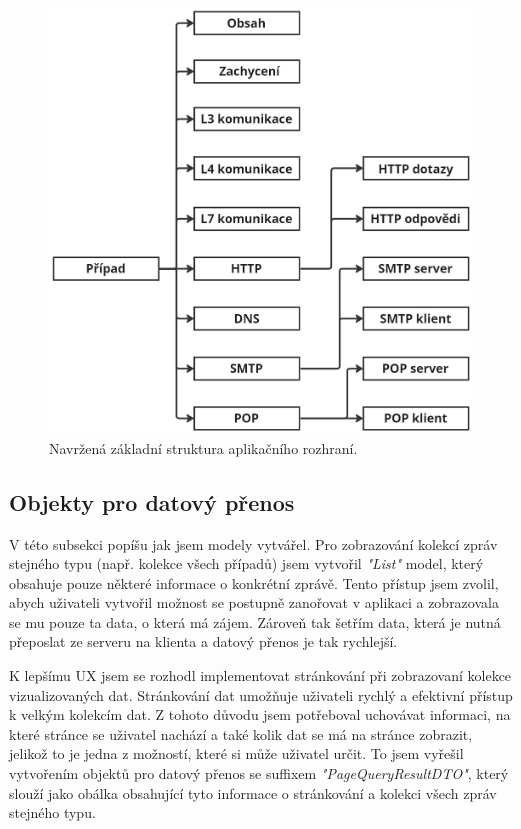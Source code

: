         \begin{figure}[H]
            \centering
            \includegraphics[scale=0.3]{obrazky-figures/Implementace/NavrhAPI/APIStructure.jpg}
            \caption{Navržená základní struktura aplikačního rozhraní.}
            \label{fig:APICaseDesign}
        \end{figure}

    \subsection{Objekty pro datový přenos}
        V této subsekci popíšu jak jsem modely vytvářel. Pro zobrazování kolekcí zpráv stejného typu (např. kolekce všech případů) jsem vytvořil \textit{"List"} model, který obsahuje pouze některé informace o konkrétní zprávě. Tento přístup jsem zvolil, abych uživateli vytvořil možnost se postupně zanořovat v aplikaci a zobrazovala se mu pouze ta data, o která má zájem. Zároveň tak šetřím data, která je nutná přeposlat ze serveru na klienta a datový přenos je tak rychlejší.
        
        K lepšímu \gls{UX} jsem se rozhodl implementovat stránkování při zobrazovaní kolekce vizualizovaných dat. Stránkování dat umožňuje uživateli rychlý a efektivní přístup k velkým kolekcím dat. Z tohoto důvodu jsem potřeboval uchovávat informaci, na které stránce se uživatel nachází a také kolik dat se má na stránce zobrazit, jelikož to je jedna z možností, které si může uživatel určit. To jsem vyřešil vytvořením objektů pro datový přenos se suffixem \textit{"PageQueryResultDTO"}, který slouží jako obálka obsahující tyto informace o stránkování a kolekci všech zpráv stejného typu.


